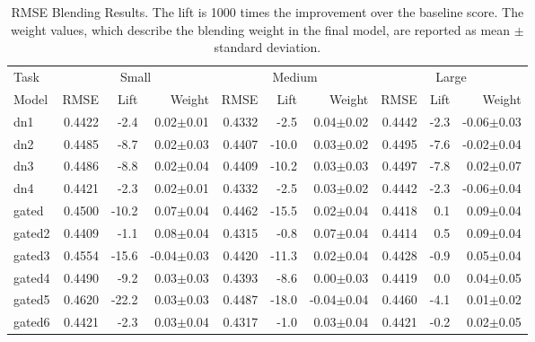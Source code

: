 \documentclass{article}
\begin{document}

\begin{table}[t]
\caption{RMSE Blending Results.  The lift is 1000 times the improvement over the baseline score.  The weight values, which describe the blending weight in the final model, are reported as mean $\pm$ standard deviation.}
\label{table:rmse-results}
\vskip 0.15in
\begin{center}
\begin{small}
\begin{sc}
\begin{tabular}{l|rr r|rr r|rr r}
\hline
\abovespace\belowspace
Task & \multicolumn{3}{|c}{Small} & \multicolumn{3}{|c}{Medium} & \multicolumn{3}{|c}{Large} \\
Model
& RMSE & Lift & Weight 
& RMSE & Lift & Weight 
& RMSE & Lift & Weight \\
\hline
\abovespace
dn1        & 0.4422 &  -2.4 &  0.02$\pm$0.01& 0.4332 &  -2.5 &  0.04$\pm$0.02& 0.4442 &  -2.3 & -0.06$\pm$0.03 \\ 
dn2        & 0.4485 &  -8.7 &  0.02$\pm$0.03& 0.4407 & -10.0 &  0.03$\pm$0.02& 0.4495 &  -7.6 & -0.02$\pm$0.04 \\ 
dn3        & 0.4486 &  -8.8 &  0.02$\pm$0.04& 0.4409 & -10.2 &  0.03$\pm$0.03& 0.4497 &  -7.8 &  0.02$\pm$0.07 \\ 
dn4        & 0.4421 &  -2.3 &  0.02$\pm$0.01& 0.4332 &  -2.5 &  0.03$\pm$0.02& 0.4442 &  -2.3 & -0.06$\pm$0.04 \\ 
\abovespace
gated      & 0.4500 & -10.2 &  0.07$\pm$0.04& 0.4462 & -15.5 &  0.02$\pm$0.04& 0.4418 &   0.1 &  0.09$\pm$0.04 \\ 
gated2     & 0.4409 &  -1.1 &  0.08$\pm$0.04& 0.4315 &  -0.8 &  0.07$\pm$0.04& 0.4414 &   0.5 &  0.09$\pm$0.04 \\ 
gated3     & 0.4554 & -15.6 & -0.04$\pm$0.03& 0.4420 & -11.3 &  0.02$\pm$0.04& 0.4428 &  -0.9 &  0.05$\pm$0.04 \\ 
gated4     & 0.4490 &  -9.2 &  0.03$\pm$0.03& 0.4393 &  -8.6 &  0.00$\pm$0.03& 0.4419 &   0.0 &  0.04$\pm$0.05 \\ 
gated5     & 0.4620 & -22.2 &  0.03$\pm$0.03& 0.4487 & -18.0 & -0.04$\pm$0.04& 0.4460 &  -4.1 &  0.01$\pm$0.02 \\ 
gated6     & 0.4421 &  -2.3 &  0.03$\pm$0.04& 0.4317 &  -1.0 &  0.03$\pm$0.04& 0.4421 &  -0.2 &  0.02$\pm$0.05 \\ 

\end{tabular}
\end{sc}
\end{small}
\end{center}
\end{table}
\end{document}
